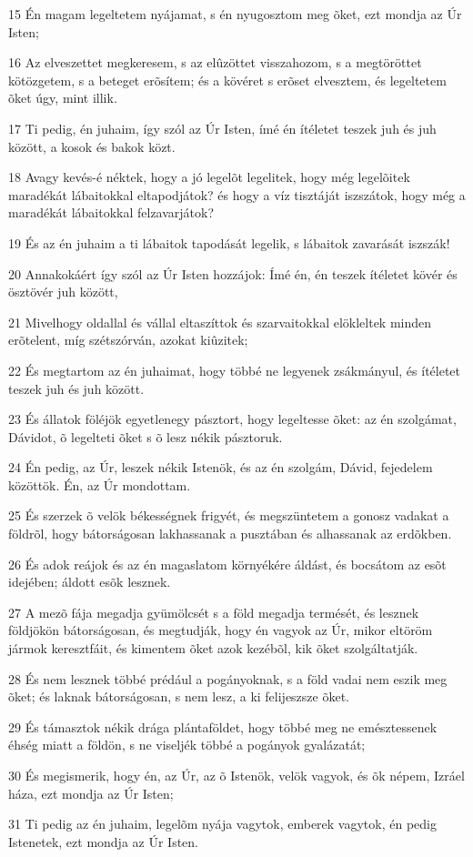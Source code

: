 \par 15 Én magam legeltetem nyájamat, s én nyugosztom meg õket, ezt mondja az Úr Isten;
\par 16 Az elveszettet megkeresem, s az elûzöttet visszahozom, s a megtöröttet kötözgetem, s a beteget erõsítem; és a kövéret s erõset elvesztem, és legeltetem õket úgy, mint illik.
\par 17 Ti pedig, én juhaim, így szól az Úr Isten, ímé én ítéletet teszek juh és juh között, a kosok és bakok közt.
\par 18 Avagy kevés-é néktek, hogy a jó legelõt legelitek, hogy még legelõitek maradékát lábaitokkal eltapodjátok? és hogy a víz tisztáját iszszátok, hogy még a maradékát lábaitokkal felzavarjátok?
\par 19 És az én juhaim a ti lábaitok tapodását legelik, s lábaitok zavarását iszszák!
\par 20 Annakokáért így szól az Úr Isten hozzájok: Ímé én, én teszek ítéletet kövér és ösztövér juh között,
\par 21 Mivelhogy oldallal és vállal eltaszíttok és szarvaitokkal elökleltek minden erõtelent, míg szétszórván, azokat kiûzitek;
\par 22 És megtartom az én juhaimat, hogy többé ne legyenek zsákmányul, és ítéletet teszek juh és juh között.
\par 23 És állatok föléjök egyetlenegy pásztort, hogy legeltesse õket: az én szolgámat, Dávidot,  õ legelteti õket s õ lesz nékik pásztoruk.
\par 24 Én pedig, az Úr, leszek nékik Istenök, és az én szolgám, Dávid, fejedelem közöttök. Én, az Úr mondottam.
\par 25 És szerzek õ velök békességnek frigyét, és megszüntetem a gonosz vadakat  a földrõl, hogy bátorságosan lakhassanak a pusztában és alhassanak az erdõkben.
\par 26 És adok reájok és az én magaslatom környékére áldást, és bocsátom az esõt idejében; áldott esõk lesznek.
\par 27 A mezõ fája megadja gyümölcsét s a föld megadja termését, és lesznek földjökön bátorságosan, és megtudják, hogy én vagyok az Úr, mikor eltöröm jármok keresztfáit, és kimentem õket azok kezébõl, kik õket szolgáltatják.
\par 28 És nem lesznek többé prédául a pogányoknak, s a föld vadai nem eszik meg õket; és laknak bátorságosan, s nem lesz, a ki felijeszsze õket.
\par 29 És támasztok nékik drága plántaföldet, hogy többé meg ne emésztessenek  éhség miatt a földön, s ne viseljék többé a pogányok gyalázatát;
\par 30 És megismerik, hogy én, az Úr, az õ Istenök, velök vagyok, és õk népem, Izráel háza, ezt mondja az Úr Isten;
\par 31 Ti pedig az én juhaim, legelõm nyája vagytok, emberek vagytok, én pedig Istenetek, ezt mondja az Úr Isten.

